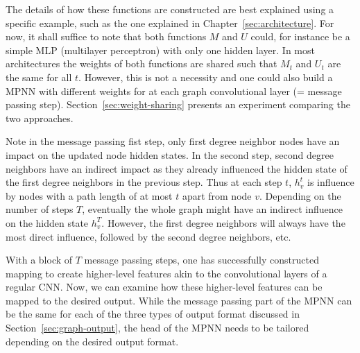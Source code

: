The details of how these functions are constructed are best explained using a specific example, such as the one explained in Chapter~\ref{sec:architecture}.
For now, it shall suffice to note that both functions $M$ and $U$ could, for instance be a simple MLP (multilayer perceptron) with only one hidden layer. In most architectures the weights of both functions are shared such that $M_t$ and $U_t$ are the same for all $t$. However, this is not a necessity and one could also build a MPNN with different weights for at each graph convolutional layer (= message passing step). Section~\ref{sec:weight-sharing} presents an experiment comparing the two approaches.

Note in the message passing fist step, only first degree neighbor nodes have an impact on the updated node hidden states. In the second step, second degree neighbors have an indirect impact as they already influenced the hidden state of the first degree neighbors in the previous step. Thus at each step $t$, $h_v^t$ is influence by nodes with a path length of at most $t$ apart from node $v$. Depending on the number of steps $T$, eventually the whole graph might have an indirect influence on the hidden state $h_v^T$. However, the first degree neighbors will always have the most direct influence, followed by the second degree neighbors, etc.

With a block of $T$ message passing steps, one has successfully constructed mapping to create higher-level features akin to the convolutional layers of a regular CNN. Now, we can examine how these higher-level features can be mapped to the desired output. While the message passing part of the MPNN can be the same for each of the three types of output format discussed in Section~\ref{sec:graph-output}, the head of the MPNN needs to be tailored depending on the desired output format.

